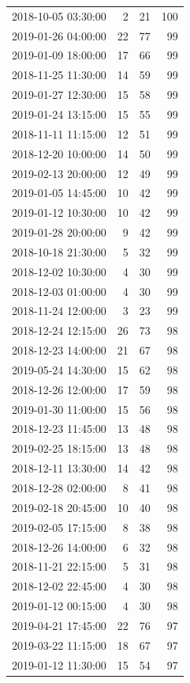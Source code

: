\begin{tabular}{lrrr}
2018-10-05 03:30:00 & 2 & 21 & 100 \\
2019-01-26 04:00:00 & 22 & 77 & 99 \\
2019-01-09 18:00:00 & 17 & 66 & 99 \\
2018-11-25 11:30:00 & 14 & 59 & 99 \\
2019-01-27 12:30:00 & 15 & 58 & 99 \\
2019-01-24 13:15:00 & 15 & 55 & 99 \\
2018-11-11 11:15:00 & 12 & 51 & 99 \\
2018-12-20 10:00:00 & 14 & 50 & 99 \\
2019-02-13 20:00:00 & 12 & 49 & 99 \\
2019-01-05 14:45:00 & 10 & 42 & 99 \\
2019-01-12 10:30:00 & 10 & 42 & 99 \\
2019-01-28 20:00:00 & 9 & 42 & 99 \\
2018-10-18 21:30:00 & 5 & 32 & 99 \\
2018-12-02 10:30:00 & 4 & 30 & 99 \\
2018-12-03 01:00:00 & 4 & 30 & 99 \\
2018-11-24 12:00:00 & 3 & 23 & 99 \\
2018-12-24 12:15:00 & 26 & 73 & 98 \\
2018-12-23 14:00:00 & 21 & 67 & 98 \\
2019-05-24 14:30:00 & 15 & 62 & 98 \\
2018-12-26 12:00:00 & 17 & 59 & 98 \\
2019-01-30 11:00:00 & 15 & 56 & 98 \\
2018-12-23 11:45:00 & 13 & 48 & 98 \\
2019-02-25 18:15:00 & 13 & 48 & 98 \\
2018-12-11 13:30:00 & 14 & 42 & 98 \\
2018-12-28 02:00:00 & 8 & 41 & 98 \\
2019-02-18 20:45:00 & 10 & 40 & 98 \\
2019-02-05 17:15:00 & 8 & 38 & 98 \\
2018-12-26 14:00:00 & 6 & 32 & 98 \\
2018-11-21 22:15:00 & 5 & 31 & 98 \\
2018-12-02 22:45:00 & 4 & 30 & 98 \\
2019-01-12 00:15:00 & 4 & 30 & 98 \\
2019-04-21 17:45:00 & 22 & 76 & 97 \\
2019-03-22 11:15:00 & 18 & 67 & 97 \\
2019-01-12 11:30:00 & 15 & 54 & 97 \\

\end{tabular}
